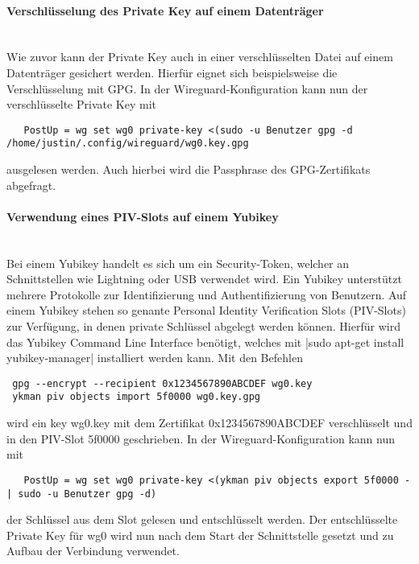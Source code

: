 \paragraph{Verschl\"usselung des Private Key auf einem Datentr\"ager}
\noindent \\Wie zuvor kann der Private Key auch in einer verschl\"usselten Datei auf einem Datentr\"ager gesichert werden. Hierfür eignet sich beispielsweise die Verschl\"usselung mit GPG. In der Wireguard-Konfiguration kann nun der verschl\"usselte Private Key mit 
\begin{verbatim}
   PostUp = wg set wg0 private-key <(sudo -u Benutzer gpg -d /home/justin/.config/wireguard/wg0.key.gpg
\end{verbatim}
ausgelesen werden. Auch hierbei wird die Passphrase des GPG-Zertifikats abgefragt. 

\paragraph{Verwendung eines PIV-Slots auf einem Yubikey}
\noindent \\Bei einem Yubikey handelt es sich um ein Security-Token, welcher an Schnittstellen wie Lightning oder USB verwendet wird. Ein Yubikey unterst\"utzt mehrere Protokolle zur Identifizierung und Authentifizierung von Benutzern. Auf einem Yubikey stehen so genante Personal Identity Verification Slots (PIV-Slots) zur Verf\"ugung, in denen private Schl\"ussel abgelegt werden k\"onnen. Hierf\"ur wird das Yubikey Command Line Interface ben\"otigt, welches mit |sudo apt-get install yubikey-manager| installiert werden kann. Mit den Befehlen 
\begin{verbatim}
 gpg --encrypt --recipient 0x1234567890ABCDEF wg0.key
 ykman piv objects import 5f0000 wg0.key.gpg
\end{verbatim}
wird ein key wg0.key mit dem Zertifikat 0x1234567890ABCDEF verschl\"usselt und in den PIV-Slot 5f0000 geschrieben. In der Wireguard-Konfiguration kann nun mit
\begin{verbatim}
   PostUp = wg set wg0 private-key <(ykman piv objects export 5f0000 - | sudo -u Benutzer gpg -d)
\end{verbatim}
der Schl\"ussel aus dem Slot gelesen und entschl\"usselt werden. Der entschl\"usselte Private Key für wg0 wird nun nach dem Start der Schnittstelle gesetzt  und zu Aufbau der Verbindung verwendet. 






  

